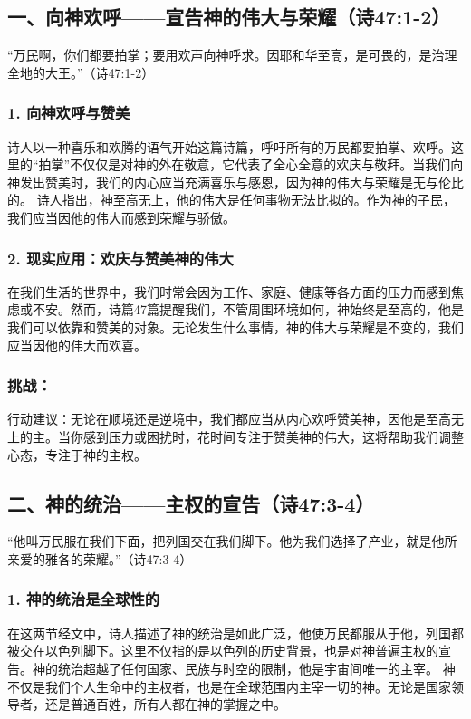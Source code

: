 \documentclass[a4paper, 12pt]{article}
\begin{document}
\subsection*{一、向神欢呼——宣告神的伟大与荣耀（诗47:1-2）}
“万民啊，你们都要拍掌；要用欢声向神呼求。因耶和华至高，是可畏的，是治理全地的大王。”（诗47:1-2）

\subsubsection*{1. 向神欢呼与赞美}
诗人以一种喜乐和欢腾的语气开始这篇诗篇，呼吁所有的万民都要拍掌、欢呼。这里的“拍掌”不仅仅是对神的外在敬意，它代表了全心全意的欢庆与敬拜。当我们向神发出赞美时，我们的内心应当充满喜乐与感恩，因为神的伟大与荣耀是无与伦比的。
诗人指出，神至高无上，他的伟大是任何事物无法比拟的。作为神的子民，我们应当因他的伟大而感到荣耀与骄傲。
\subsubsection*{2. 现实应用：欢庆与赞美神的伟大}
在我们生活的世界中，我们时常会因为工作、家庭、健康等各方面的压力而感到焦虑或不安。然而，诗篇47篇提醒我们，不管周围环境如何，神始终是至高的，他是我们可以依靠和赞美的对象。无论发生什么事情，神的伟大与荣耀是不变的，我们应当因他的伟大而欢喜。
\subsubsection*{挑战：}

行动建议：无论在顺境还是逆境中，我们都应当从内心欢呼赞美神，因他是至高无上的主。当你感到压力或困扰时，花时间专注于赞美神的伟大，这将帮助我们调整心态，专注于神的主权。
\subsection*{二、神的统治——主权的宣告（诗47:3-4）}
“他叫万民服在我们下面，把列国交在我们脚下。他为我们选择了产业，就是他所亲爱的雅各的荣耀。”（诗47:3-4）

\subsubsection*{1. 神的统治是全球性的}
在这两节经文中，诗人描述了神的统治是如此广泛，他使万民都服从于他，列国都被交在以色列脚下。这里不仅指的是以色列的历史背景，也是对神普遍主权的宣告。神的统治超越了任何国家、民族与时空的限制，他是宇宙间唯一的主宰。
神不仅是我们个人生命中的主权者，也是在全球范围内主宰一切的神。无论是国家领导者，还是普通百姓，所有人都在神的掌握之中。
\end{document}
